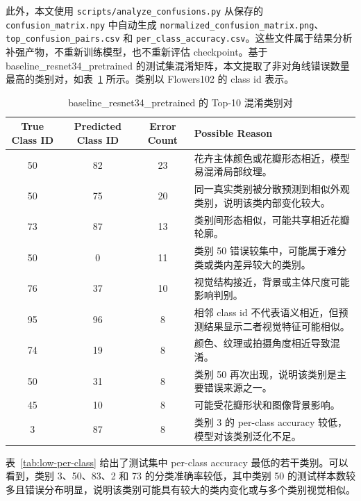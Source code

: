 \documentclass[UTF8]{ctexart}
\begin{document}
此外，本文使用 \verb|scripts/analyze_confusions.py| 从保存的 \verb|confusion_matrix.npy| 中自动生成 \verb|normalized_confusion_matrix.png|、\verb|top_confusion_pairs.csv| 和 \verb|per_class_accuracy.csv|。这些文件属于结果分析补强产物，不重新训练模型，也不重新评估 checkpoint。基于 baseline\_resnet34\_pretrained 的测试集混淆矩阵，本文提取了非对角线错误数量最高的类别对，如表~\ref{tab:top-confusion-pairs} 所示。类别以 Flowers102 的 class id 表示。

\begin{table}[H]
\centering
\caption{baseline\_resnet34\_pretrained 的 Top-10 混淆类别对}
\label{tab:top-confusion-pairs}
\begin{tabular}{cccp{6.5cm}}
\toprule
True Class ID & Predicted Class ID & Error Count & Possible Reason \\
\midrule
50 & 82 & 23 & 花卉主体颜色或花瓣形态相近，模型易混淆局部纹理。 \\
50 & 75 & 20 & 同一真实类别被分散预测到相似外观类别，说明该类内部变化较大。 \\
73 & 87 & 13 & 类别间形态相似，可能共享相近花瓣轮廓。 \\
50 & 0 & 11 & 类别 50 错误较集中，可能属于难分类或类内差异较大的类别。 \\
76 & 37 & 10 & 视觉结构接近，背景或主体尺度可能影响判别。 \\
95 & 96 & 8 & 相邻 class id 不代表语义相近，但预测结果显示二者视觉特征可能相似。 \\
74 & 19 & 8 & 颜色、纹理或拍摄角度相近导致混淆。 \\
50 & 31 & 8 & 类别 50 再次出现，说明该类别是主要错误来源之一。 \\
45 & 10 & 8 & 可能受花瓣形状和图像背景影响。 \\
3 & 87 & 8 & 类别 3 的 per-class accuracy 较低，模型对该类别泛化不足。 \\
\bottomrule
\end{tabular}
\end{table}

表~\ref{tab:low-per-class} 给出了测试集中 per-class accuracy 最低的若干类别。可以看到，类别 3、50、83、2 和 73 的分类准确率较低，其中类别 50 的测试样本数较多且错误分布明显，说明该类别可能具有较大的类内变化或与多个类别视觉相似。
\end{document}
